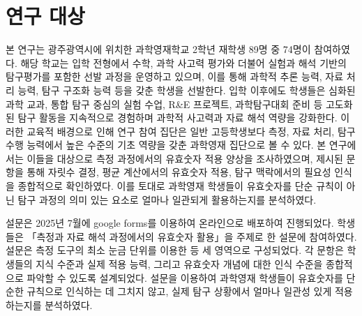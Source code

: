 \section{연구 대상}

본 연구는 광주광역시에 위치한 과학영재학교 2학년 재학생 89명 중 74명이 참여하였다.
%
해당 학교는 입학 전형에서 수학, 과학 사고력 평가와 더불어 실험과 해석 기반의 탐구평가를 포함한
선발 과정을 운영하고 있으며,
%
이를 통해 과학적 추론 능력, 자료 처리 능력, 탐구 구조화 능력 등을 갖춘 학생을 선발한다.
입학 이후에도 학생들은 심화된 과학 교과, 통합 탐구 중심의 실험 수업, R\&E 프로젝트,
과학탐구대회 준비 등 고도화된 탐구 활동을 지속적으로 경험하며 과학적 사고력과 자료 해석 역량을 강화한다.
%
이러한 교육적 배경으로 인해 연구 참여 집단은 일반 고등학생보다 측정, 자료 처리, 탐구 수행 능력에서
높은 수준의 기초 역량을 갖춘 과학영재 집단으로 볼 수 있다.
%
본 연구에서는 이들을 대상으로 측정 과정에서의 유효숫자 적용 양상을 조사하였으며,
제시된 문항을 통해 자릿수 결정, 평균 계산에서의 유효숫자 적용, 탐구 맥락에서의 필요성 인식을
종합적으로 확인하였다.
%
이를 토대로 과학영재 학생들이 유효숫자를 단순 규칙이 아닌 탐구 과정의 의미 있는 요소로
얼마나 일관되게 활용하는지를 분석하였다.

설문은 2025년 7월에 google forms를 이용하여 온라인으로 배포하여 진행되었다.
%
학생들은 「측정과 자료 해석 과정에서의 유효숫자 활용」을 주제로 한 설문에 참여하였다.
설문은 측정 도구의 최소 눈금 단위를 이용한  등
세 영역으로 구성되었다.
각 문항은 학생들의 지식 수준과 실제 적용 능력, 그리고 유효숫자 개념에 대한 인식 수준을
종합적으로 파악할 수 있도록 설계되었다.
%
설문을 이용하여 과학영재 학생들이 유효숫자를 단순한 규칙으로 인식하는 데 그치지 않고,
실제 탐구 상황에서 얼마나 일관성 있게 적용하는지를 분석하였다.
